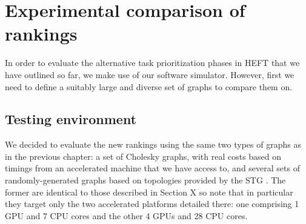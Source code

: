 \documentclass[12pt]{article}
\begin{document}
\section{Experimental comparison of rankings}
\label{sect.experimental_rankings}

In order to evaluate the alternative task prioritization phases in HEFT that we have outlined so far, we make use of our software simulator. However, first we need to define a suitably large and diverse set of graphs to compare them on. 

\subsection{Testing environment}
\label{subsect.graphs}

We decided to evaluate the new rankings using the same two types of graphs as in the previous chapter: a set of Cholesky graphs, with real costs based on timings from an accelerated machine that we have access to, and several sets of randomly-generated graphs based on topologies provided by the STG \cite{tob02}. The former are identical to those described in Section X so note that in particular they target only the two accelerated platforms detailed there: one comprising 1 GPU and 7 CPU cores and the other 4 GPUs and 28 CPU cores.
\end{document}
